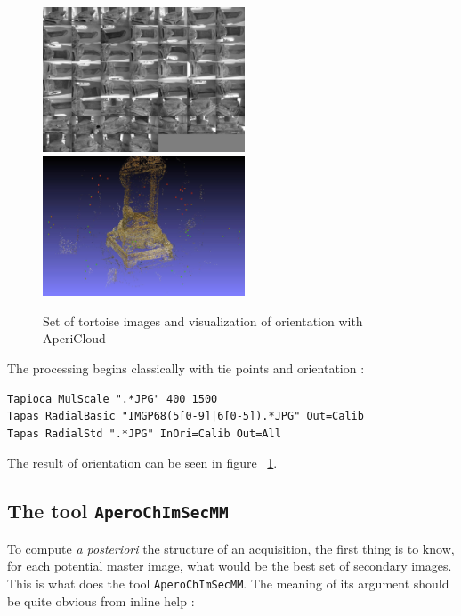 \begin{figure}
\begin{center}
\includegraphics[width=60mm]{FIGS/Tortue/AllTortues.jpg}
\includegraphics[width=60mm]{FIGS/Tortue/AP-snapshot00.jpg}
\end{center}
\caption{Set of tortoise images and visualization of orientation with AperiCloud}
\label{FIG:Tortue:Input}
\end{figure}




The processing begins classically with tie points and orientation :

\begin{verbatim}
Tapioca MulScale ".*JPG" 400 1500
Tapas RadialBasic "IMGP68(5[0-9]|6[0-5]).*JPG" Out=Calib
Tapas RadialStd ".*JPG" InOri=Calib Out=All
\end{verbatim}

The result of orientation can be seen in figure ~\ref{FIG:Tortue:Input}.



\subsection{The tool {\tt AperoChImSecMM}}

To compute \emph{a posteriori} the structure of an acquisition, the first thing is to know,
for each potential master image, what would be the best set of secondary  images.
This is what does the tool {\tt AperoChImSecMM}. The meaning of its argument should be
quite obvious from inline help :

